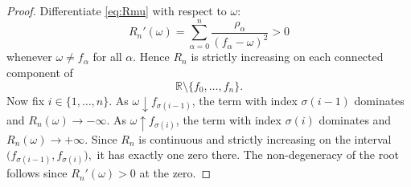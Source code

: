 \documentclass[10pt,a4paper]{amsart}
\newcommand{\R}{{\mathbb R}}
\begin{document}
\begin{proof}
Differentiate \eqref{eq:Rmu} with respect to $\omega$:
\[
R_n'(\omega)=\sum_{\alpha=0}^n \frac{\rho_\alpha}{(f_\alpha-\omega)^2}>0
\]
whenever $\omega\neq f_\alpha$ for all $\alpha$. Hence $R_n$ is strictly increasing on each connected component of
\[
\R\setminus\{f_0,\dots,f_n\}.
\]
Now fix $i\in\{1,\dots,n\}$. As $\omega\downarrow f_{\sigma(i-1)}$, the term with index $\sigma(i-1)$ dominates and
$R_n(\omega)\to -\infty.$
As $\omega\uparrow f_{\sigma(i)}$, the term with index $\sigma(i)$ dominates and
$R_n(\omega)\to +\infty.$
Since $R_n$ is continuous and strictly increasing on the interval
$\bigl(f_{\sigma(i-1)},f_{\sigma(i)}\bigr),$
it has exactly one zero there. The non-degeneracy of the root follows since $R_n'(\omega)>0$ at the zero.
\end{proof}
\end{document}
